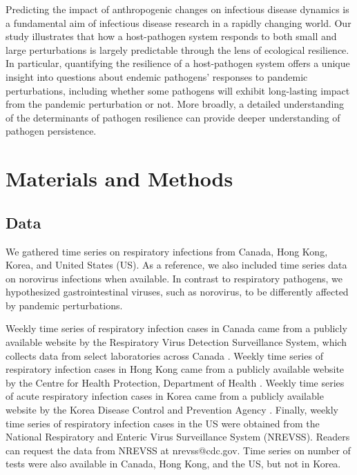 \documentclass[12pt]{article}
\newcommand{\comment}{\showcomment}
\newcommand{\showcomment}[3]{\textcolor{#1}{\textbf{[#2: }\textsl{#3}\textbf{]}}}
\newcommand{\swp}[1]{\comment{magenta}{SWP}{#1}}
\begin{document}
Predicting the impact of anthropogenic changes on infectious disease dynamics is a fundamental aim of infectious disease research in a rapidly changing world.
Our study illustrates that how a host-pathogen system responds to both small and large perturbations is largely predictable through the lens of ecological resilience.
In particular, quantifying the resilience of a host-pathogen system offers a unique insight into questions about endemic pathogens' responses to pandemic perturbations, including whether some pathogens will exhibit long-lasting impact from the pandemic perturbation or not.
More broadly, a detailed understanding of the determinants of pathogen resilience can provide deeper understanding of pathogen persistence.

\section*{Materials and Methods}

\subsection*{Data}

We gathered time series on respiratory infections from Canada, Hong Kong, Korea, and United States (US).
As a reference, we also included time series data on norovirus infections when available.
In contrast to respiratory pathogens, we hypothesized gastrointestinal viruses, such as norovirus, to be differently affected by pandemic perturbations.

Weekly time series of respiratory infection cases in Canada came from a publicly available website by the Respiratory Virus Detection Surveillance System, which collects data from select laboratories across Canada \citep{phac}.
Weekly time series of respiratory infection cases in Hong Kong came from a publicly available website by the Centre for Health Protection, Department of Health \citep{hkdata,hkdata2}.
Weekly time series of acute respiratory infection cases in Korea came from a publicly available website by the Korea Disease Control and Prevention Agency \citep{kordata}.
Finally, weekly time series of respiratory infection cases in the US were obtained from the National Respiratory and Enteric Virus Surveillance System (NREVSS). Readers can request the data from NREVSS at nrevss@cdc.gov.
Time series on number of tests were also available in Canada, Hong Kong, and the US, but not in Korea.
\end{document}
